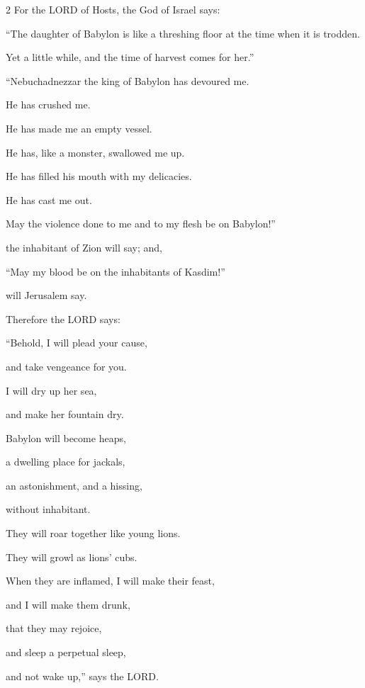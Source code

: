 \begin{multicols}{2}
\myverse{}For the LORD of Hosts, the God of Israel says:

“The daughter of Babylon is like a threshing floor at the time when it is trodden.

Yet a little while, and the time of harvest comes for her.”

\vspace{\baselineskip}

\myverse{}“Nebuchadnezzar the king of Babylon has devoured me.

He has crushed me.

He has made me an empty vessel.

He has, like a monster, swallowed me up.

He has filled his mouth with my delicacies.

He has cast me out.


\myverse{}May the violence done to me and to my flesh be on Babylon!”

the inhabitant of Zion will say; and,

“May my blood be on the inhabitants of Kasdim!”

will Jerusalem say.

\vspace{\baselineskip}

\myverse{}Therefore the LORD says:

“Behold, I will plead your cause,

and take vengeance for you.

I will dry up her sea,

and make her fountain dry.


\myverse{}Babylon will become heaps,

a dwelling place for jackals,

an astonishment, and a hissing,

without inhabitant.


\myverse{}They will roar together like young lions.

They will growl as lions’ cubs.


\myverse{}When they are inflamed, I will make their feast,

and I will make them drunk,

that they may rejoice,

and sleep a perpetual sleep,

and not wake up,” says the LORD.

\vspace{\baselineskip}


\end{multicols}
